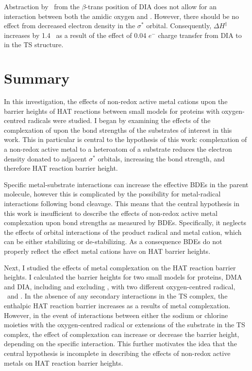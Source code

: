 \begin{doublespace}
Abstraction by \cumo\ from the $\beta$-trans position of DIA does not allow for
an interaction between both the amidic oxygen and \cumo. However, there should
be no effect from decreased electron density in the  $\sigma^*$ orbital.
Consequently, $\Delta H^\ddagger$ increases by 1.4 \kcalmol\ as a result of the
effect of 0.04 $e^-$ charge transfer from DIA to  in the TS structure.


\section{Summary}

In this investigation, the effects of non-redox active metal cations upon the
barrier heights of HAT reactions between small models for proteins with
oxygen-centred radicals were studied. I began by examining the effects of the
complexation of  upon the  bond strengths of the substrates of
interest in this work. This in particular is central to the hypothesis of this
work: complexation of a non-redox active metal to a heteroatom of a substrate
reduces the electron density donated to adjacent  $\sigma^*$ orbitals,
increasing the  bond strength, and therefore HAT reaction barrier
height.

Specific metal-substrate interactions can increase the effective  BDEs
in the parent molecule, however this is complicated by the possibility for
metal-radical interactions following bond cleavage. This means that the central
hypothesis in this work is insufficient to describe the effects of non-redox
active metal complexation upon  bond strengths as measured by BDEs.
Specifically, it neglects the effects of orbital interactions of the product
radical and metal cation, which can be either stabilizing or de-stabilizing. As
a consequence BDEs do not properly reflect the effect metal cations have on
HAT barrier heights.

Next, I studied the effects of metal complexation on the HAT reaction barrier
heights. I calculated the barrier heights for two small models for proteins, DMA
and DIA, including and excluding , with two different oxygen-centred
radical, \bno\ and \cumo. In the absence of any secondary interactions in the TS
complex, the enthalpic HAT reaction barrier increases as a results of metal
complexation. However, in the event of interactions between either the sodium or
chlorine moieties with the oxygen-centred radical or extensions of the substrate
in the TS complex, the effect of complexation can increase or decrease the
barrier height, depending on the specific interaction. This further motivates
the idea that the central hypothesis is incomplete in describing the effects of
non-redox active metals on HAT reaction barrier heights.


\end{doublespace}
